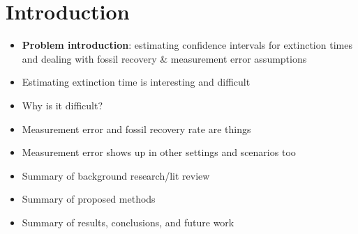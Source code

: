 
\chapter{Introduction}\label{intro}

\begin{itemize}
    \item \textbf{Problem introduction}: estimating confidence intervals for extinction times and dealing with fossil recovery \& measurement error assumptions
    \item Estimating extinction time is interesting and difficult
    \item Why is it difficult?
    \item Measurement error and fossil recovery rate are things
    \item Measurement error shows up in other settings and scenarios too
    \item Summary of background research/lit review
    \item Summary of proposed methods
    \item Summary of results, conclusions, and future work
\end{itemize}
